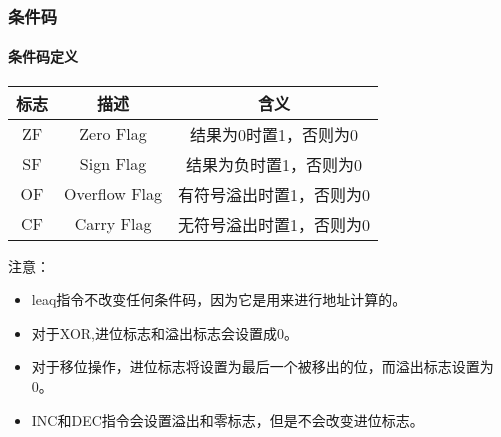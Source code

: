 \subsubsection{条件码}
\paragraph{条件码定义}
\begin{table}[H]
    \centering
    \begin{tabular}{|c|c|c|}
        \hline
        \textbf{标志} & \textbf{描述}   & \textbf{含义}   \\
        \hline
        ZF          & Zero Flag     & 结果为0时置1，否则为0  \\
        \hline
        SF          & Sign Flag     & 结果为负时置1，否则为0  \\
        \hline
        OF          & Overflow Flag & 有符号溢出时置1，否则为0 \\
        \hline
        CF          & Carry Flag    & 无符号溢出时置1，否则为0 \\
        \hline
    \end{tabular}
\end{table}

注意：
\begin{itemize}
    \item leaq指令不改变任何条件码，因为它是用来进行地址计算的。
    \item 对于XOR,进位标志和溢出标志会设置成0。
    \item 对于移位操作，进位标志将设置为最后一个被移出的位，而溢出标志设置为0。
    \item INC和DEC指令会设置溢出和零标志，但是不会改变进位标志。
\end{itemize}
